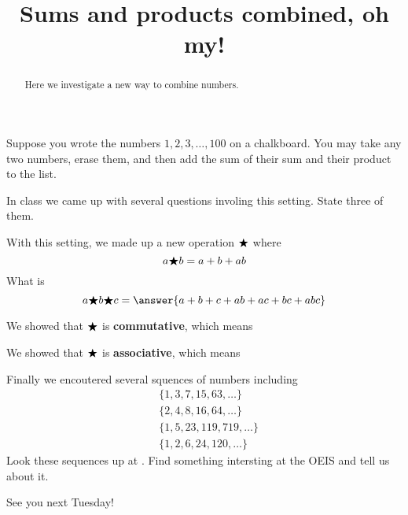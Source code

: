 \documentclass[handout,nooutcomes,space]{ximera}
\title{Sums and products combined, oh my!}
\begin{document}
\begin{abstract}
Here we investigate a new way to combine numbers.
\end{abstract}
\maketitle

Suppose you wrote the numbers $1,2,3,\dots,100$ on a chalkboard. You
may take any two numbers, erase them, and then add the sum of their
sum and their product to the list.

\begin{problem}
In class we came up with several questions involing this setting. State three of them. 
\begin{freeResponse}
\end{freeResponse}
\end{problem}

\begin{problem}
  With this setting, we made up a new operation $\bigstar$ where
  \[
  a\bigstar b = a+b + ab
  \]
  What is
  \[
  a\pt b\pt c = \answer{a+b+c+ab+ac+bc+abc}
  \]
\end{problem}

\begin{problem}
We showed that $\bigstar$ is \textbf{commutative}, which means
\begin{multipleChoice}
\end{multipleChoice}
\end{problem}

\begin{problem}
We showed that $\bigstar$ is \textbf{associative}, which means
\begin{multipleChoice}
\end{multipleChoice}
\end{problem}

\begin{problem}
Finally we encoutered several squences of numbers including
\begin{align*}
  &\{ 1, 3, 7, 15, 63,\dots\}\\
  &\{ 2, 4, 8, 16, 64,\dots\}\\
  &\{ 1, 5, 23, 119, 719,\dots\}\\
  &\{ 1, 2, 6, 24, 120,\dots\}
\end{align*}
Look these sequences up at . Find something intersting at the OEIS and tell us about it.
\begin{freeResponse}
\end{freeResponse}
See you next Tuesday!
\end{problem}
\end{document}
